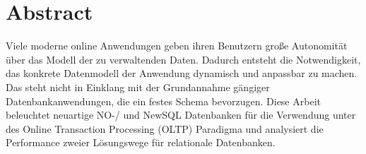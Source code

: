 \chapter*{Abstract}
Viele moderne online Anwendungen geben ihren Benutzern große Autonomität über das Modell der zu verwaltenden Daten. Dadurch entsteht die Notwendigkeit, das konkrete Datenmodell der Anwendung dynamisch und anpassbar zu machen. Das steht nicht in Einklang mit der Grundannahme gängiger Datenbankanwendungen, die ein festes Schema bevorzugen. Diese Arbeit beleuchtet neuartige NO-/ und NewSQL Datenbanken für die Verwendung unter des Online Transaction Processing (OLTP) Paradigma und analysiert die Performance zweier Lösungswege für relationale Datenbanken.

\newpage